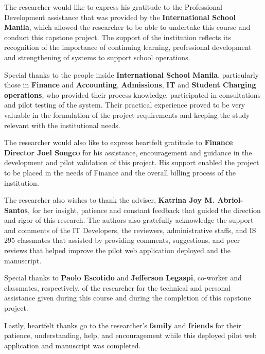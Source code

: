 
\begin{acknowledgement}

The researcher would like to express his gratitude to the Professional Development assistance that was provided by the \textbf{International School Manila}, which allowed the researcher to be able to undertake this course and conduct this capstone project. The support of the institution reflects its recognition of the importance of continuing learning, professional development and strengthening of systems to support school operations. 

Special thanks to the people inside \textbf{International School Manila}, particularly those in \textbf{Finance} and \textbf{Accounting}, \textbf{Admissions}, \textbf{IT} and \textbf{Student Charging operations}, who provided their process knowledge, participated in consultations and pilot testing of the system. Their practical experience proved to be very valuable in the formulation of the project requirements and keeping the study relevant with the institutional needs. 

The researcher would also like to express heartfelt gratitude to \textbf{Finance Director Joel Songco} for his assistance, encouragement and guidance in the development and pilot validation of this project. His support enabled the project to be placed in the needs of Finance and the overall billing process of the institution. 

The researcher also wishes to thank the adviser, \textbf{Katrina Joy M. Abriol-Santos}, for her insight, patience and constant feedback that guided the direction and rigor of this research. The authors also gratefully acknowledge the support and comments of the IT Developers, the reviewers, administrative staffs, and IS 295 classmates that assisted by providing comments, suggestions, and peer reviews that helped improve the pilot web application deployed and the manuscript. 

Special thanks to \textbf{Paolo Escotido} and \textbf{Jefferson Legaspi}, co-worker and classmates, respectively, of the researcher for the technical and personal assistance given during this course and during the completion of this capstone project. 

Lastly, heartfelt thanks go to the researcher’s \textbf{family} and \textbf{friends} for their patience, understanding, help, and encouragement while this deployed pilot web application and manuscript was completed.
\end{acknowledgement}